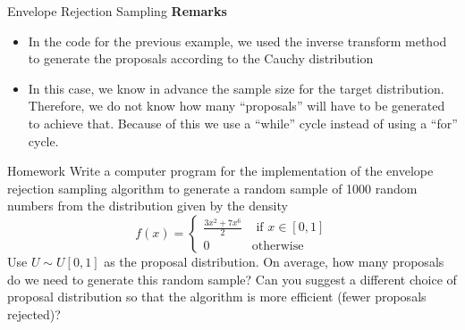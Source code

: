 \documentclass[8pt]{beamer}
\begin{document}
\begin{frame}{Envelope Rejection Sampling}
\textbf{Remarks} 

\begin{itemize}
	\item In the code for the previous example, we used the inverse transform method to generate the proposals according to the Cauchy distribution
	\item In this case, we know in advance the sample size for the target distribution. Therefore, we do not know how many ``proposals'' will have to be generated to achieve that. Because of this we use a ``while'' cycle instead of using a ``for'' cycle.
\end{itemize}
\end{frame}

\begin{frame}{Homework}
Write a computer program for the implementation of the envelope rejection sampling algorithm to generate a random sample of 1000 random numbers from the distribution given by the density 
\begin{equation*}
f(x)=\left\{ \begin{array}{ll}
\displaystyle{\frac{3x^2+7x^6}{2}} & \text { if } x\in [0,1]\\
0 & \text{otherwise}
\end{array}
\right.
\end{equation*}
Use $U \sim U[0,1]$ as the proposal distribution. On average, how many proposals do we need to generate this random sample? Can you suggest a different choice of proposal distribution so that the algorithm is more efficient (fewer proposals rejected)?
\end{frame}
\end{document}
